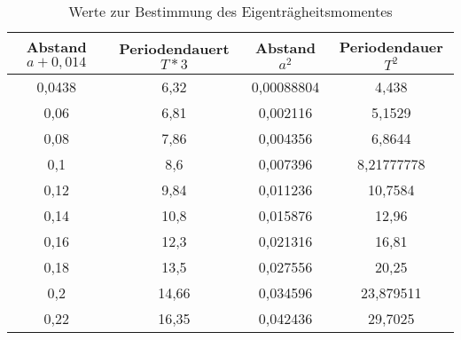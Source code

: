 \begin{table}[h]
	\begin{center}
		\begin{tabular}{cccc}
Abstand $a+0,014$&Periodendauert $T*3$&Abstand $a^2$&Periodendauer $T^2$\\ \hline

0,0438&6,32&0,00088804&4,438\\
0,06&6,81&0,002116&5,1529\\
0,08&7,86&0,004356&6,8644\\
0,1&8,6&0,007396&8,21777778\\
0,12&9,84&0,011236&10,7584\\
0,14&10,8&0,015876&12,96\\
0,16&12,3&0,021316&16,81\\
0,18&13,5&0,027556&20,25\\
0,2&14,66&0,034596&23,879511\\
0,22&16,35&0,042436&29,7025

			\end{tabular}
		\caption{Werte zur Bestimmung des Eigenträgheitsmomentes}
		\label{tab:eigentragheitsmom}
	\end{center}
\end{table}